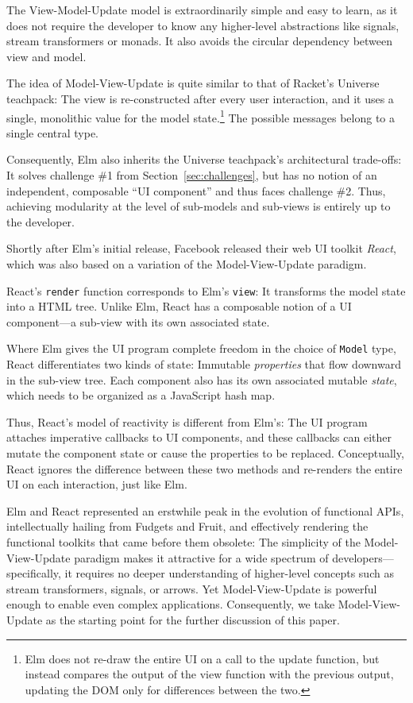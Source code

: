 \documentclass[sigplan,review,screen]{acmart}
\begin{document}
The View-Model-Update model is extraordinarily simple and easy to
learn, as it does not require the developer to know any higher-level
abstractions like signals, stream transformers or monads.  It also
avoids the circular dependency between view and model.

The idea of Model-View-Update is quite similar to that of Racket's
Universe teachpack: The view is re-constructed after every user
interaction, and it uses a single, monolithic value for the model
state.\footnote{Elm does not re-draw the entire UI on a call to the
  update function, but instead compares the output of the view
  function with the previous output, updating the DOM only for
  differences between the two.}  The possible messages belong to a
single central type.

Consequently, Elm also inherits the Universe teachpack's architectural
trade-offs: It solves challenge \#1 from Section~\ref{sec:challenges},
but has no notion of an
independent, composable ``UI component'' and thus faces challenge \#2.
Thus, achieving modularity
at the level of sub-models and sub-views is entirely up to the
developer.

Shortly after Elm's initial release, Facebook released their web UI
toolkit \textit{React}, which was also based on a variation of the
Model-View-Update paradigm.

React's \texttt{render} function corresponds to Elm's \texttt{view}:
It transforms the model state into a HTML tree.  Unlike Elm,
React has a composable notion of a UI component---a sub-view with its
own associated state.

Where Elm gives the UI program complete freedom in the choice of
\texttt{Model} type, React differentiates two kinds of state:
Immutable \textit{properties} that flow downward in the sub-view tree.
Each component also has its own associated mutable \textit{state},
which needs to be organized as a JavaScript hash map.

Thus, React's model of reactivity is different from Elm's: The UI
program attaches imperative callbacks to UI components, and these
callbacks can either mutate the component state or cause the
properties to be replaced.  Conceptually, React ignores the difference
between these two methods and re-renders the entire UI on each
interaction, just like Elm.


Elm and React represented an erstwhile peak in the evolution of
functional APIs, intellectually hailing from Fudgets and Fruit, and
effectively rendering the functional toolkits that came before them
obsolete: The simplicity of the Model-View-Update paradigm makes it
attractive for a wide spectrum of developers---specifically, it
requires no deeper understanding of higher-level concepts such as
stream transformers, signals, or arrows.  Yet Model-View-Update is
powerful enough to enable even complex applications.  Consequently, we
take Model-View-Update as the starting point for the further
discussion of this paper.
\end{document}
